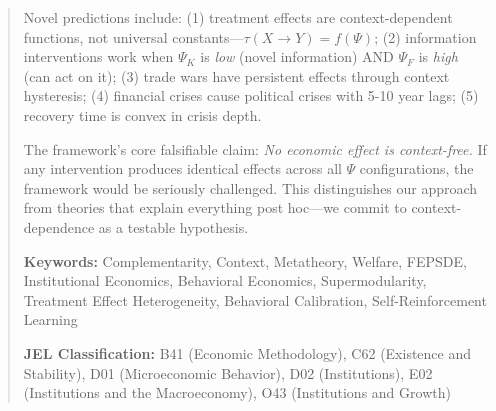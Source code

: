 \documentclass[12pt,a4paper]{article}
\begin{document}
\begin{abstract}
Novel predictions include: (1) treatment effects are context-dependent functions, not universal constants---$\tau(X \rightarrow Y) = f(\Psi)$; (2) information interventions work when $\Psi_K$ is \emph{low} (novel information) AND $\Psi_F$ is \emph{high} (can act on it); (3) trade wars have persistent effects through context hysteresis; (4) financial crises cause political crises with 5-10 year lags; (5) recovery time is convex in crisis depth.

The framework's core falsifiable claim: \emph{No economic effect is context-free.} If any intervention produces identical effects across all $\Psi$ configurations, the framework would be seriously challenged. This distinguishes our approach from theories that explain everything post hoc---we commit to context-dependence as a testable hypothesis.

\vspace{0.5em}
\noindent\textbf{Keywords:} Complementarity, Context, Metatheory, Welfare, FEPSDE, Institutional Economics, Behavioral Economics, Supermodularity, Treatment Effect Heterogeneity, Behavioral Calibration, Self-Reinforcement Learning

\vspace{0.5em}
\noindent\textbf{JEL Classification:} B41 (Economic Methodology), C62 (Existence and Stability), D01 (Microeconomic Behavior), D02 (Institutions), E02 (Institutions and the Macroeconomy), O43 (Institutions and Growth)
\end{abstract}

\end{document}
